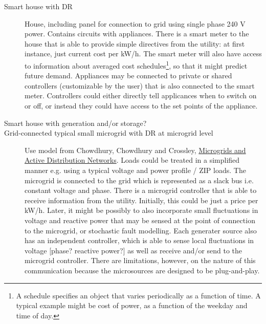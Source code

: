 \documentclass[12pt]{article}
\begin{document}
\begin{description}

\item[Smart house with DR] House, including panel for connection to grid using single phase 240 V power.  Contains circuits with appliances. There is a smart meter to the house that is able to provide simple directives from the utility: at first instance, just current cost per kW/h. The smart meter will also have access to information about averaged cost schedules\footnote{A schedule specifies an object that varies periodically as a function of time. A typical example might be cost of power, as a function of the weekday and time of day.}, so that it might predict future demand. Appliances may be connected to private or shared controllers (customizable by the user) that is also connected to the smart meter. Controllers could either directly tell applicances when to switch on or off, or instead they could have access to the set points of the appliance.

\item[Smart house with generation and/or storage?]

\item[Grid-connected typical small microgrid with DR at microgrid level] Use model from Chowdhury, Chowdhury and Crossley, \ul{Microgrids and Active Distribution Networks}. Loads could be treated in a simplified manner e.g. using a typical voltage and power profile / ZIP loads. The microgrid is connected to the grid which is represented as a slack bus i.e. constant voltage and phase. There is a microgrid controller that is able to receive information from the utility. Initially, this could be just a price per kW/h. Later, it might be possibly to also incorporate small fluctuations in voltage and reactive power that may be sensed at the point of connection to the microgrid, or stochastic fault modelling.  Each generater source also has an independent controller, which is able to sense local fluctuations in voltage [phase? reactive power?] as well as receive and/or send to the microgrid controller. There are limitations, however, on the nature of this communication because the microsources are designed to be plug-and-play.


\end{description}
\end{document}
